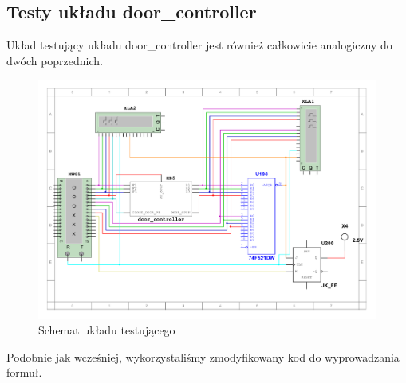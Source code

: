 \documentclass[a4paper]{article}
\begin{document}
\subsection{Testy układu door\_controller}
Układ testujący układu door\_controller jest również całkowicie analogiczny do dwóch poprzednich.

\begin{figure}[H]
    \centering
    \includegraphics[width=\textwidth]{component_test_door_controller.pdf}
    \caption{Schemat układu testującego}
\end{figure}

Podobnie jak wcześniej, wykorzystaliśmy zmodyfikowany kod do wyprowadzania formuł.
\end{document}
